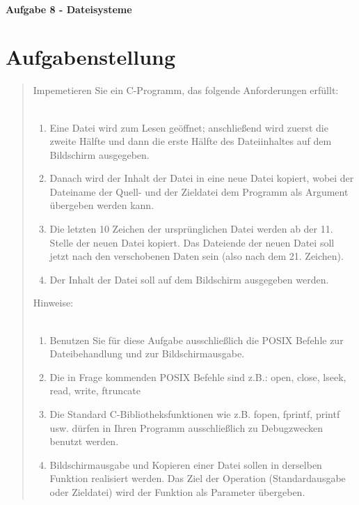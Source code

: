 \newpage

\paragraph{\LARGE Aufgabe 8 - Dateisysteme}

\section{Aufgabenstellung}
	\begin{quote}
		Impemetieren Sie ein C-Programm, das folgende Anforderungen erf\"ullt:\\ \\
		\begin{enumerate}
			\item Eine Datei wird zum Lesen ge\"offnet; anschließend wird zuerst die zweite H\"alfte und dann die erste H\"alfte des Dateiinhaltes auf dem Bildschirm ausgegeben.\\
			\item Danach wird der Inhalt der Datei in eine neue Datei kopiert, wobei der Dateiname der Quell- und der Zieldatei dem Programm als Argument \"ubergeben werden kann.\\
			\item Die letzten 10 Zeichen der urspr\"unglichen Datei werden ab der 11. Stelle der neuen Datei kopiert. Das Dateiende der neuen Datei soll jetzt nach den verschobenen Daten sein (also nach dem 21. Zeichen).\\
			\item Der Inhalt der Datei soll auf dem Bildschirm ausgegeben werden.\\
		\end{enumerate}
		Hinweise:\\ \\
		\begin{enumerate}
			\item Benutzen Sie f\"ur diese Aufgabe ausschließlich die POSIX Befehle zur Dateibehandlung und zur Bildschirmausgabe.\\
			\item Die in Frage kommenden POSIX Befehle sind z.B.: open, close, lseek, read, write, ftruncate\\
			\item Die Standard C-Bibliotheksfunktionen wie z.B. fopen, fprintf, printf usw. d\"urfen in Ihren Programm ausschließlich zu Debugzwecken benutzt werden.\\
			\item Bildschirmausgabe und Kopieren einer Datei sollen in derselben Funktion realisiert werden. Das Ziel der Operation (Standardausgabe oder Zieldatei) wird der Funktion als Parameter \"ubergeben.\\

\end{enumerate}
\end{quote}
